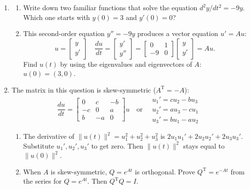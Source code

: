 \documentclass[14pt, a4paper]{article}
\begin{document}
\begin{enumerate}[resume]
    \item
          \begin{enumerate}
              \item Write down two familiar functions that solve the equation $d^2y/dt^2 = -9y$. Which one starts with $y(0) = 3$ and $y'(0) = 0$?
              \item This second-order equation $y'' = -9y$ produces a vector equation $u' = Au$:
                    \[
                        u = \begin{bmatrix} y \\ y' \end{bmatrix} \quad \frac{du}{dt} = \begin{bmatrix} y' \\ y'' \end{bmatrix} = \begin{bmatrix} 0 & 1 \\ -9 & 0 \end{bmatrix} \begin{bmatrix} y \\ y' \end{bmatrix} = Au.
                    \]
                    Find $u(t)$ by using the eigenvalues and eigenvectors of $A$: $u(0) = (3, 0)$.
          \end{enumerate}

    \item The matrix in this question is skew-symmetric ($A^{\mathrm{T}} = -A$):
          \[
              \frac{du}{dt} = \begin{bmatrix} 0 & c & -b \\ -c & 0 & a \\ b & -a & 0 \end{bmatrix} u \quad \text{or} \quad \begin{matrix} u_1' = cu_2 - bu_3 \\ u_2' = au_3 - cu_1 \\ u_3' = bu_1 - au_2 \end{matrix}
          \]
          \begin{enumerate}
              \item The derivative of $\|u(t)\|^2 = u_1^2 + u_2^2 + u_3^2$ is $2u_1u_1' + 2u_2u_2' + 2u_3u_3'$. Substitute $u_1', u_2', u_3'$ to get zero. Then $\|u(t)\|^2$ stays equal to $\|u(0)\|^2$.
              \item When $A$ is skew-symmetric, $Q = e^{At}$ is orthogonal. Prove $Q^{\mathrm{T}} = e^{-At}$ from the series for $Q = e^{At}$. Then $Q^{\mathrm{T}}Q = I$.
          \end{enumerate}


\end{enumerate}
\end{document}
